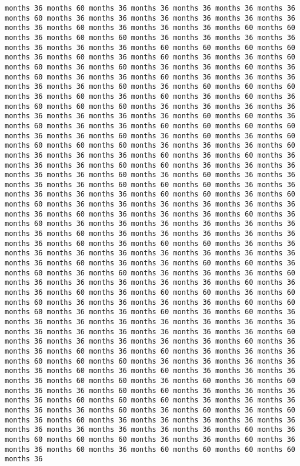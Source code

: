 \documentclass[11pt]{article}
\begin{document}
\begin{Verbatim}[commandchars=\\\{\}, frame=single, framerule=2mm, rulecolor=\color{outerrorbackground}]
months 36 months 60 months 36 months 36 months 36 months 36 months 36 months 60 months 36 months 36 months 36 months 36 months 36 months 36 months 36 months 60 months 36 months 36 months 36 months 60 months 60 months 36 months 60 months 60 months 36 months 36 months 36 months 36 months 36 months 36 months 36 months 60 months 60 months 60 months 60 months 36 months 60 months 36 months 60 months 36 months 36 months 60 months 60 months 36 months 60 months 36 months 36 months 60 months 36 months 60 months 36 months 36 months 60 months 36 months 36 months 36 months 36 months 36 months 60 months 36 months 60 months 60 months 60 months 36 months 60 months 36 months 60 months 36 months 60 months 36 months 60 months 60 months 60 months 36 months 36 months 36 months 36 months 36 months 36 months 36 months 36 months 60 months 60 months 36 months 60 months 36 months 36 months 60 months 60 months 60 months 60 months 36 months 36 months 60 months 36 months 60 months 36 months 60 months 60 months 60 months 60 months 36 months 36 months 36 months 60 months 36 months 36 months 36 months 60 months 36 months 60 months 36 months 36 months 36 months 60 months 60 months 36 months 36 months 36 months 36 months 36 months 60 months 36 months 60 months 36 months 36 months 36 months 36 months 60 months 60 months 60 months 36 months 36 months 36 months 36 months 36 months 60 months 60 months 36 months 60 months 60 months 36 months 36 months 36 months 36 months 36 months 36 months 36 months 60 months 36 months 36 months 36 months 60 months 36 months 60 months 36 months 36 months 36 months 36 months 36 months 36 months 36 months 60 months 36 months 36 months 36 months 36 months 36 months 36 months 60 months 36 months 60 months 60 months 36 months 36 months 36 months 36 months 36 months 36 months 36 months 36 months 36 months 36 months 60 months 36 months 36 months 60 months 60 months 36 months 60 months 36 months 60 months 36 months 36 months 36 months 60 months 36 months 36 months 36 months 36 months 36 months 60 months 36 months 36 months 60 months 36 months 60 months 60 months 36 months 60 months 60 months 36 months 36 months 36 months 36 months 60 months 60 months 60 months 36 months 36 months 60 months 36 months 60 months 36 months 36 months 36 months 36 months 36 months 36 months 36 months 36 months 36 months 36 months 36 months 36 months 36 months 36 months 60 months 36 months 36 months 36 months 36 months 36 months 60 months 36 months 36 months 60 months 36 months 60 months 36 months 36 months 36 months 60 months 60 months 60 months 36 months 36 months 36 months 36 months 36 months 60 months 36 months 60 months 36 months 36 months 36 months 36 months 60 months 60 months 36 months 60 months 36 months 60 months 36 months 36 months 60 months 60 months 36 months 36 months 36 months 36 months 60 months 60 months 60 months 36 months 36 months 36 months 36 months 36 months 60 months 36 months 60 months 36 months 60 months 36 months 60 months 36 months 36 months 36 months 36 months 36 months 36 months 36 months 36 months 36 months 36 months 60 months 36 months 60 months 60 months 60 months 36 months 36 months 60 months 36 months 36 months 60 months 36 months 60 months 60 months 60 months 60 months 36 
\end{Verbatim}
\end{document}
